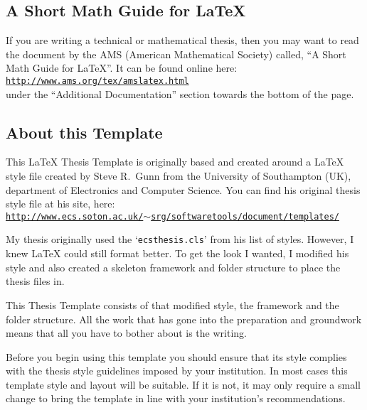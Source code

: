 \subsection{A Short Math Guide for \LaTeX{}}

If you are writing a technical or mathematical thesis, then you may want to read the document by the AMS (American Mathematical Society) called, ``A Short Math Guide for \LaTeX{}''. It can be found online here:\\
\href{http://www.ams.org/tex/amslatex.html}{\texttt{http://www.ams.org/tex/amslatex.html}}\\
under the ``Additional Documentation'' section towards the bottom of the page.

\subsection{About this Template}

This \LaTeX{} Thesis Template is originally based and created around a \LaTeX{} style file created by Steve R.\ Gunn from the University of Southampton (UK), department of Electronics and Computer Science. You can find his original thesis style file at his site, here:\\
\href{http://www.ecs.soton.ac.uk/~srg/softwaretools/document/templates/}{\texttt{http://www.ecs.soton.ac.uk/$\sim$srg/softwaretools/document/templates/}}

My thesis originally used the `\texttt{ecsthesis.cls}' from his list of styles. However, I knew \LaTeX{} could still format better. To get the look I wanted, I modified his style and also created a skeleton framework and folder structure to place the thesis files in.

This Thesis Template consists of that modified style, the framework and the folder structure. All the work that has gone into the preparation and groundwork means that all you have to bother about is the writing.

Before you begin using this template you should ensure that its style complies with the thesis style guidelines imposed by your institution. In most cases this template style and layout will be suitable. If it is not, it may only require a small change to bring the template in line with your institution's recommendations.
